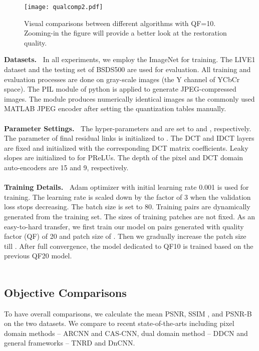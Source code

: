 \documentclass{article}
\begin{document}
\begin{figure*}[htb]
  \vspace{-0.5cm}
  \begin{minipage}[b]{1.0\linewidth}
    \centering
    \centerline{\texttt{[image: qualcomp2.pdf]}}
\caption{Visual comparisons between different algorithms with QF=10.
    Zooming-in the figure will provide a better look at the restoration quality.}\medskip
    \label{fig:f3}
    \vspace{-0.7cm}
  \end{minipage}
\end{figure*}

\textbf{Datasets.\ }
In all experiments, we employ the ImageNet \cite{ILSVRC15} for training.
The LIVE1 dataset and the testing set of BSDS500 are used for evaluation.
All training and evaluation processes are done on gray-scale images
(the Y channel of YCbCr space). The PIL module of python is applied to
generate JPEG-compressed images. The module produces numerically identical images
as the commonly used MATLAB JPEG encoder after setting the quantization tables manually.
\vspace{-0.1cm}
\\\\
\textbf{Parameter Settings.\ }
The hyper-parameters  and  are set to  and ,
respectively. The parameter  of final residual links is initialized
to . The DCT and IDCT layers are fixed and initialized with the
corresponding DCT matrix coefficients. Leaky slopes are initialized
to  for PReLUs. The depth of the pixel and DCT domain auto-encoders
are 15 and 9, respectively.
\vspace{-0.1cm}
\\\\
\textbf{Training Details.\ }
Adam optimizer with initial learning rate 0.001 is used for training.
The learning rate is scaled down by the factor of 3 when
the validation loss stops decreasing. The batch size is set to 80.
Training pairs are dynamically generated from the training set. The sizes of
training patches are not fixed. As an easy-to-hard transfer, we first train
our model on pairs generated with quality factor (QF) of 20 and patch size
of . Then we gradually increase the patch size
till . After full convergence, the model
dedicated to QF10 is trained based on the previous QF20 model.  \\\\
\vspace{-1.1cm}
\subsection{Objective Comparisons}
\vspace{-0.2cm}
\label{ssec:bsds500}
To have overall comparisons, we calculate the mean PSNR,
SSIM \cite{wang2004image}, and PSNR-B \cite{yim2011quality} on the
two datasets. We compare to recent state-of-the-arts including
pixel domain methods -- ARCNN and CAS-CNN, dual domain method
-- DDCN and general frameworks -- TNRD \cite{chen2017trainable}
and DnCNN\cite{zhang2017beyond}.
\end{document}
